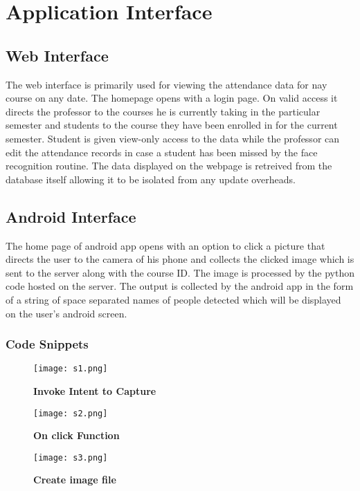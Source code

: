 \documentclass{article}
\begin{document}
\section{Application Interface}
\subsection{Web Interface} The web interface is primarily used for viewing the attendance data for nay course on any date. The homepage opens with a login page. On valid access it directs the professor to the courses he is currently taking in the particular semester and students to the course they have been enrolled in for the current semester. Student is given view-only access to the data while the professor can edit the attendance records in case a student has been missed by the face recognition routine. The data displayed on the webpage is retreived from the database itself allowing it to be isolated from any update overheads.
\subsection{Android Interface} The home page of android app opens with an option to click a picture that directs the user to the camera of his phone and collects the clicked image which is sent to the server along with the course ID. The image is processed by the python code hosted on the server. The output is collected by the android app in the form of a string of space separated names of people detected which will be displayed on the user's android screen.
\subsubsection{Code Snippets}
\begin{figure}[H]
\begin{center}
\texttt{[image: s1.png]}
\caption{\textbf{Invoke Intent to Capture}}
\label{Fig:diag3_1}
\end{center}
\end{figure}

\begin{figure}[H]
\begin{center}
\texttt{[image: s2.png]}
\caption{\textbf{On click Function}}
\label{Fig:diag3_2}
\end{center}
\end{figure}

\begin{figure}[H]
\begin{center}
\texttt{[image: s3.png]}
\caption{\textbf{Create image file}}
\label{Fig:diag3_3}
\end{center}
\end{figure}
\end{document}
